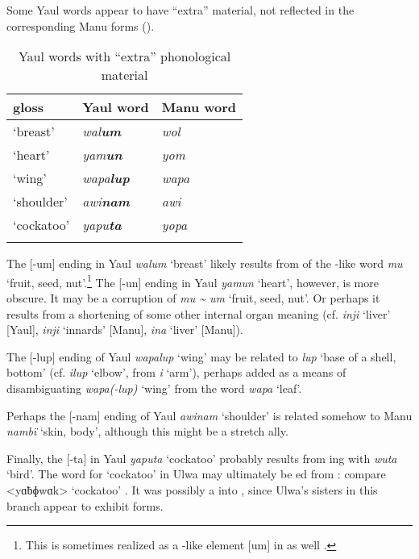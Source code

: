   Some Yaul words appear to have “extra”  material, not reflected in the corresponding Manu forms (). \largerpage

\begin{table}
\caption{Yaul words with “extra” phonological material}
\label{tab:18.23}
\begin{tabular}{lll}
\lsptoprule
gloss & Yaul word & Manu word\\
\midrule
‘breast’ & {\itshape wal\textbf{um}} & {\itshape wol}\\
‘heart’ & {\itshape yam\textbf{un}} & {\itshape yom}\\
‘wing’ & {\itshape wapa\textbf{lup}} & {\itshape wapa}\\
‘shoulder’ & {\itshape awi\textbf{nam}} & {\itshape awi}\\
‘cockatoo’ & {\itshape yapu\textbf{ta}} & {\itshape yopa}\\
\lspbottomrule
\end{tabular}
\end{table}

The [-um] ending in Yaul \textit{walum} ‘breast’ likely results from  of the -like word \textit{mu} ‘fruit, seed, nut’.\footnote{This is sometimes realized as a -like element [um] in  as well \citep[65]{Barlow2020a}.} The [-un] ending in Yaul \textit{yamun} ‘heart’, however, is more obscure. It may be a corruption of \textit{mu {\textasciitilde} um} ‘fruit, seed, nut’. Or perhaps it results from a shortening of some other internal organ meaning (cf. \textit{inji} ‘liver’ [Yaul], \textit{inji} ‘innards’ [Manu], \textit{ina} ‘liver’ [Manu]).

The [-lup] ending of Yaul \textit{wapalup} ‘wing’ may be related to \textit{lup} ‘base of a shell, bottom’ (cf. \textit{ilup} ‘elbow’, from \textit{i} ‘arm’), perhaps added as a means of disambiguating \textit{wapa(-lup)} ‘wing’ from the  word \textit{wapa} ‘leaf’.

Perhaps the [-nam] ending of Yaul \textit{awinam} ‘shoulder’ is related somehow to Manu \textit{nambï} ‘skin, body’, although this might be a stretch ally.

Finally, the [-ta] in Yaul \textit{yaputa} ‘cockatoo’ probably results from ing with \textit{wuta} ‘bird’. The word for ‘cockatoo’ in Ulwa may ultimately be ed from : compare  <yɑƀɸwɑk> ‘cockatoo’ \citep[5040]{Laycock1971b}. It was possibly a  into , since Ulwa’s sisters in this branch appear to exhibit  forms.

